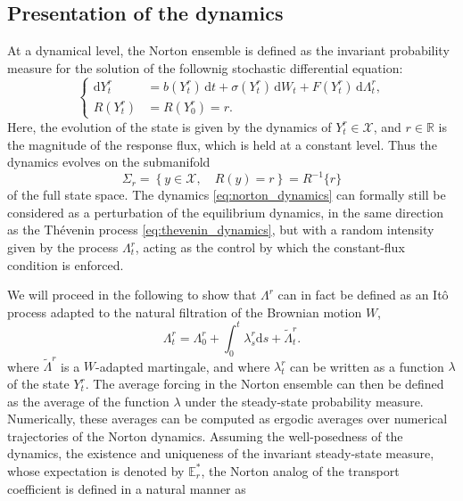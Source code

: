 \documentclass[pdflatex,sn-mathphys]{sn-jnl}%
\theoremstyle{thmstyleone}%
\theoremstyle{thmstyletwo}%
\theoremstyle{thmstylethree}%
\renewcommand{\d}{\mathrm{d}}
\newcommand{\1}{\mathbbm{1}}
\newcommand{\Yr}{Y^r}
\newcommand{\lambdar}{\lambda^r}
\newcommand{\Lambdar}{\Lambda^r}
\begin{document}
\subsection{Presentation of the dynamics}
At a dynamical level, the Norton ensemble is defined as the invariant probability measure for the solution of the follownig stochastic differential equation:
\begin{equation}
    \label{eq:norton_dynamics}
    \left\{\begin{aligned}
    \d \Yr_t &= b(\Yr_t)\, \d t + \sigma(\Yr_t)\, \d W_t +  F(\Yr_t)\,\d\Lambdar_t,\\
    R(\Yr_t) &= R(\Yr_0)=r.
    \end{aligned}\right.
\end{equation}
Here, the evolution of the state is given by the dynamics of $\Yr_t \in \mathcal X$, and $r\in \mathbb{R}$ is the magnitude of the response flux, which is held at a constant level. Thus the dynamics evolves on the submanifold
\begin{equation}
    \label{eq:norton_submanifold}
    \Sigma_r =\left\{y\in \mathcal{X},\quad R(y)=r\right\} = R^{-1}\{r\}
\end{equation}
of the full state space. The dynamics \eqref{eq:norton_dynamics} can formally still be considered as a perturbation of the equilibrium dynamics, in the same direction as the Th\'evenin process \eqref{eq:thevenin_dynamics}, but with a random intensity given by the process $\Lambdar_t$, acting as the control by which the constant-flux condition is enforced.

We will proceed in the following to show that $\Lambdar$ can in fact be defined as an Itô process adapted to the natural filtration of the Brownian motion $W$,
\begin{equation}
    \label{eq:norton_lambda_sde}
    \Lambdar_t = \Lambdar_0 + \int_0^t \lambdar_s \d s + \widetilde{\Lambda}^r_t.
\end{equation}
where $\widetilde{\Lambda}^r$ is a $W$-adapted martingale, and where $\lambdar_t$ can be written as a function $\lambda$ of the state $\Yr_t$. The average forcing in the Norton ensemble can then be defined as the average of the function $\lambda$ under the steady-state probability measure.
Numerically, these averages can be computed as ergodic averages over numerical trajectories of the Norton dynamics. Assuming the well-posedness of the dynamics, the existence and uniqueness of the invariant steady-state measure, whose expectation is denoted by $\mathbb{E}_{r}^*$, the Norton analog of the transport coefficient is defined in a natural manner as
\end{document}
